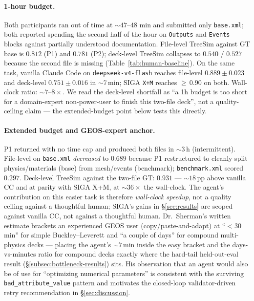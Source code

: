 \documentclass{article}
\begin{document}
\paragraph{1-hour budget.} Both participants ran out of time at $\sim\!47$--$48$ min and submitted only \texttt{base.xml}; both reported spending the second half of the hour on \texttt{Outputs} and \texttt{Events} blocks against partially understood documentation. File-level TreeSim against GT base is $0.812$ (P1) and $0.781$ (P2); deck-level TreeSim collapses to $0.540$ / $0.527$ because the second file is missing (Table~\ref{tab:human-baseline}). On the same task, vanilla Claude Code on \texttt{deepseek-v4-flash} reaches file-level $0.889 \pm 0.023$ and deck-level $0.751 \pm 0.016$ in $\sim\!7\,$min; SIGA \texttt{X+M} reaches ${\geq}\,0.90$ on both. Wall-clock ratio: ${\sim}7$--$8\times$. We read the deck-level shortfall as ``a 1h budget is too short for a domain-expert non-power-user to finish this two-file deck'', not a quality-ceiling claim --- the extended-budget point below tests this directly.

\paragraph{Extended budget and GEOS-expert anchor.} P1 returned with no time cap and produced both files in $\sim\!3\,$h (intermittent). File-level on \texttt{base.xml} \emph{decreased} to $0.689$ because P1 restructured to cleanly split physics/materials (base) from mesh/events (benchmark); \texttt{benchmark.xml} scored $0.297$. Deck-level TreeSim against the two-file GT: $\mathbf{0.931}$ --- $\sim\!18\,$pp above vanilla CC and at parity with SIGA X+M, at $\sim\!36\times$ the wall-clock. The agent's contribution on this easier task is therefore \emph{wall-clock speedup}, not a quality ceiling against a thoughtful human; SIGA's gains in \S\ref{sec:results} are scoped against vanilla CC, not against a thoughtful human. Dr.~Sherman's written estimate brackets an experienced GEOS user (copy/paste-and-adapt) at ``${<}30\,$min'' for simple Buckley--Leverett and ``a couple of days'' for compound multi-physics decks --- placing the agent's $\sim\!7\,$min inside the easy bracket and the days-vs-minutes ratio for compound decks exactly where the hard-tail held-out-eval result (\S\ref{subsec:bottleneck-results}) sits. His observation that an agent would also be of use for ``optimizing numerical parameters'' is consistent with the surviving \texttt{bad\_attribute\_value} pattern and motivates the closed-loop validator-driven retry recommendation in \S\ref{sec:discussion}.
\end{document}
